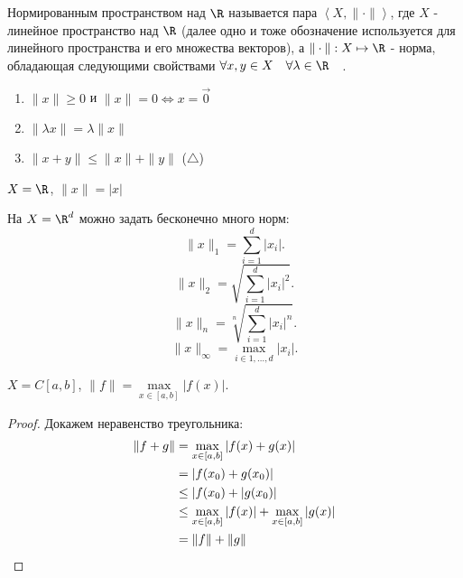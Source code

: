 
\begin{definition} \thmslashn 

    Нормированным пространством над $\R$ называется пара $\left<X, \|\cdot\|\right>$, где $X$ - линейное пространство над $\R$ (далее одно и тоже обозначение используется для линейного пространства и его множества векторов), а $\|\cdot\| : X \mapsto \R$ - норма, обладающая следующими свойствами $\forall{x, y\in X}\quad \forall{\lambda\in \R}\quad $.

    \begin{enumerate}
        \item $\|x\| \ge 0$ и $\|x\| = 0 \iff x = \vec{0}$
        \item $\|\lambda x\| = \lambda \|x\|$
        \item $\|x + y\| \le \|x\| + \|y\|$ ($\triangle$)
    \end{enumerate}
\end{definition}
\begin{example} \thmslashn

    $X = \R$,  $\|x\| = |x|$
\end{example}
\begin{example} \thmslashn

    На $X = \R^{d}$ можно задать бесконечно много норм:
    \[ \|x\|_{1} = \sum\limits_{i=1}^{d} |x_{i}| .\]
    \[ \|x\|_{2} = \sqrt{\sum\limits_{i=1}^{d} |x_{i}|^{2}}  .\]
    \[ \|x\|_{n} = \sqrt[n]{\sum\limits_{i=1}^{d} |x_{i}|^{n}}  .\]
    \[ \|x\|_{\infty} = \max\limits_{i\in 1, \ldots, d} |x_{i}| .\] 
\end{example}
\begin{example} \thmslashn

    $X = C[a, b]$,  $\|f\| = \max\limits_{x\in [a, b]} |f(x)|$.

    \begin{proof} \thmslashn
    
        Докажем неравенство треугольника:
        \begin{equation*}
            \begin{split}
                \|f + g\|
                &= \max\limits_{x\in [a, b]} |f(x) + g(x)|\\
                &= |f(x_0) + g(x_0)|\\
                &\le |f(x_0) + |g(x_0)|\\
                &\le \max\limits_{x\in [a, b]} |f(x)| + \max\limits_{x\in [a, b]} |g(x)|\\
                &= \|f\| + \|g\| \qedhere
            \end{split}
        \end{equation*}
    \end{proof}
\end{example}
